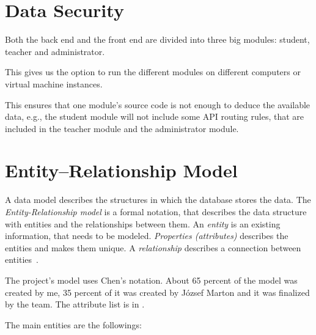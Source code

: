  
 \section{Data Security}
 Both the back end and the front end are divided into three big modules: student, teacher and administrator. 

 This gives us the option to run the different modules on different computers or virtual machine instances.
 
 This ensures that one module's source code is not enough to deduce the available data, e.g., the student module will not include some API routing rules, that are included in the teacher module and the administrator module.
 

\section{Entity–Relationship Model}
\label{ER-model}

A data model describes the structures in which the database stores the data. The \emph{Entity-Relationship model} is a formal notation, that describes the data structure with entities and the relationships between them. An \emph{entity} is an existing information, that needs to be modeled. \emph{Properties (attributes)} describes the entities and makes them unique. A \emph{relationship} describes a connection between entities~\cite{adatb}.
 
The project's model uses Chen's notation. About 65 percent of the model was created by me, 35 percent of it was created by József Marton and it was finalized by the team. The attribute list is in .

The main entities are the followings:

